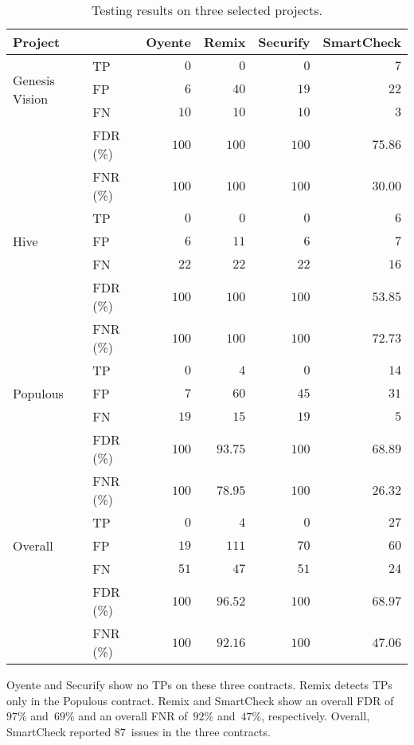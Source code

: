 \begin{table*}[t]
	\centering
	\caption{Testing results on three selected projects.}
	\begin{tabular}{|l|l|r|r|r|r|}
		\hline
		\textbf{Project} &  & \textbf{Oyente} & \textbf{Remix} & \textbf{Securify} & \textbf{SmartCheck} \\
		\hline
		\multirow{3}{*}{Genesis Vision}
			& TP & $0$ & $0$ & $0$ & $7$ \\
			& FP & $6$ & $40$ & $19$ & $22$ \\
			& FN & $10$ & $10$ & $10$ & $3$ \\
			& FDR (\%) & $100$ & $100$ & $100$ & $75.86$ \\
			& FNR (\%) & $100$ & $100$ & $100$ & $30.00$ \\
		\hline
		\multirow{3}{*}{Hive}
			& TP & $0$ & $0$ & $0$ & $6$ \\
			& FP & $6$ & $11$ & $6$ & $7$ \\
			& FN & $22$ & $22$ & $22$ & $16$ \\
			& FDR (\%) & $100$ & $100$ & $100$ & $53.85$ \\
			& FNR (\%) & $100$ & $100$ & $100$ & $72.73$ \\
		\hline
		\multirow{3}{*}{Populous}
			& TP & $0$ & $4$ & $0$ & $14$ \\
			& FP & $7$ & $60$ & $45$ & $31$ \\
			& FN & $19$ & $15$ & $19$ & $5$ \\
			& FDR (\%) & $100$ & $93.75$ & $100$ & $68.89$ \\
			& FNR (\%) & $100$ & $78.95$ & $100$ & $26.32$ \\
		\hline
		\multirow{3}{*}{Overall}
			& TP & $0$ & $4$ & $0$ & $27$ \\
			& FP & $19$ & $111$ & $70$ & $60$ \\
			& FN & $51$ & $47$ & $51$ & $24$ \\
			& FDR (\%) & $100$ & $96.52$ & $100$ & $68.97$ \\
			& FNR (\%) & $100$ & $92.16$ & $100$ & $47.06$ \\
		\hline
	\end{tabular}
	\label{CaseStudyTable}
\end{table*}

Oyente and Securify show no TPs on these three contracts.
Remix detects TPs only in the Populous contract.
Remix and SmartCheck show an overall FDR of~$97\%$ and~$69\%$ and an overall FNR of~$92\%$ and~$47\%$, respectively.
Overall, SmartCheck reported $87$~issues in the three contracts.

